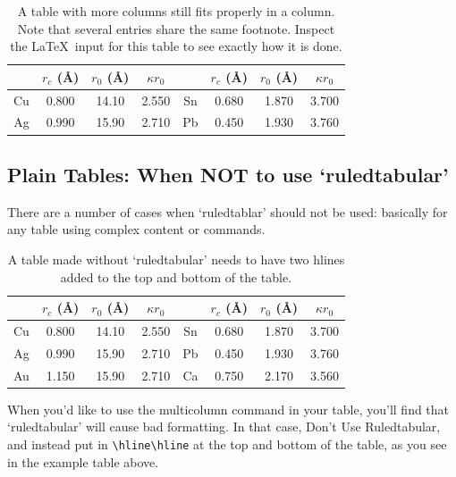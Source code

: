 \documentclass{JASA-EL}
\begin{document}
\begin{table}[ht]
\caption{\label{tab:table1}A table with more columns still fits
properly in a column. Note that several entries share the same
footnote. Inspect the \LaTeX\ input for this table to see
exactly how it is done.}

\begin{ruledtabular}
\begin{tabular}{cccccccc}
 &$r_c$ (\AA)\footnotemark[1]&$r_0$ (\AA)&$\kappa r_0$&
 &$r_c$ (\AA) &$r_0$ (\AA)&$\kappa r_0$\\
\hline
Cu& 0.800 & 14.10 & 2.550 &Sn\footnotemark[1]
& 0.680 & 1.870 & 3.700 \\
Ag& 0.990 & 15.90 & 2.710 &Pb\footnotemark[2]
& 0.450 & 1.930 & 3.760 \\
\end{tabular}
\end{ruledtabular}
\end{table}

\subsection{Plain Tables: When NOT to use `ruledtabular'}
There are a number of cases when `ruledtablar' should not
be used: basically for any table using complex content or 
commands.
\newpage



\begin{table}[ht]
\caption{A table made without `ruledtabular' needs to have two hlines
added to the top and bottom of the table.}
\vskip3pt
\begin{tabular}{cccccccc}
\hline\hline
 &$r_c$ (\AA)\footnotemark[1]&$r_0$ (\AA)&$\kappa r_0$&
 &$r_c$ (\AA) &$r_0$ (\AA)&$\kappa r_0$\\
\hline
Cu& 0.800 & 14.10 & 2.550 &Sn\footnotemark[1]
& 0.680 & 1.870 & 3.700 \\
Ag& 0.990 & 15.90 & 2.710 &Pb\footnotemark[2]
& 0.450 & 1.930 & 3.760 \\
Au& 1.150 & 15.90 & 2.710 &Ca\footnotemark[3]
& 0.750 & 2.170 & 3.560\\
\hline\hline
\end{tabular}
\end{table}

When you'd like to use the multicolumn command in your
table, you'll find that `ruledtabular' will cause bad
formatting. In that case, Don't Use Ruledtabular, and
instead put in \verb+\hline\hline+ at the top and bottom of
the table, as you see in the example table above.
\end{document}
